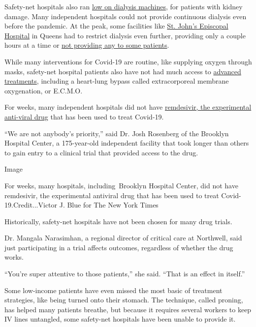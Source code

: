 Safety-net hospitals also ran
\href{https://www.nytimes3xbfgragh.onion/2020/04/18/health/kidney-dialysis-coronavirus.html}{low
on dialysis machines}, for patients with kidney damage. Many independent
hospitals could not provide continuous dialysis even before the
pandemic. At the peak, some facilities like
\href{https://www.nytimes3xbfgragh.onion/video/us/100000007097093/coronavirus-st-johns-hospital-far-rockaway.html}{St.
John's Episcopal Hospital} in Queens had to restrict dialysis even
further, providing only a couple hours at a time or
\href{https://www.nytimes3xbfgragh.onion/2020/05/01/health/coronavirus-dialysis-death.html}{not
providing any to some patients}.

While many interventions for Covid-19 are routine, like supplying oxygen
through masks, safety-net hospital patients also have not had much
access to
\href{https://www.nytimes3xbfgragh.onion/2020/04/26/health/coronavirus-patient-ventilator.html}{advanced
treatments}, including a heart-lung bypass called extracorporeal
membrane oxygenation, or E.C.M.O.

For weeks, many independent hospitals did not have
\href{https://www.nytimes3xbfgragh.onion/2020/04/29/health/gilead-remdesivir-coronavirus.html}{remdesivir,
the experimental anti-viral drug} that has been used to treat Covid-19.

``We are not anybody's priority,'' said Dr. Josh Rosenberg of the
Brooklyn Hospital Center, a 175-year-old independent facility that took
longer than others to gain entry to a clinical trial that provided
access to the drug.

Image

For weeks, many hospitals, including~Brooklyn Hospital Center, did not
have remdesivir, the experimental antiviral drug that has been used to
treat Covid-19.Credit...Victor J. Blue for The New York Times

Historically, safety-net hospitals have not been chosen for many drug
trials.

Dr. Mangala Narasimhan, a regional director of critical care at
Northwell, said just participating in a trial affects outcomes,
regardless of whether the drug works.

``You're super attentive to those patients,'' she said. ``That is an
effect in itself.''

Some low-income patients have even missed the most basic of treatment
strategies, like being turned onto their stomach. The technique, called
proning, has helped many patients breathe, but because it requires
several workers to keep IV lines untangled, some safety-net hospitals
have been unable to provide it.

